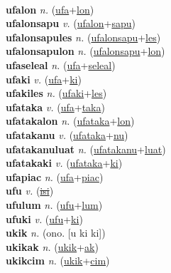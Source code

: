  \label{ufa} \\
\textbf{ufalon} \textit{n.} (\hyperref[ufa]{ufa}+\hyperref[lon]{lon})
 \label{ufalon} \\
\textbf{ufalonsapu} \textit{v.} (\hyperref[ufalon]{ufalon}+\hyperref[sapu]{sapu})
 \label{ufalonsapu} \\
\textbf{ufalonsapules} \textit{n.} (\hyperref[ufalonsapu]{ufalonsapu}+\hyperref[les]{les})
 \label{ufalonsapules} \\
\textbf{ufalonsapulon} \textit{n.} (\hyperref[ufalonsapu]{ufalonsapu}+\hyperref[lon]{lon})
 \label{ufalonsapulon} \\
\textbf{ufaseleal} \textit{n.} (\hyperref[ufa]{ufa}+\hyperref[seleal]{seleal})
 \label{ufaseleal} \\
\textbf{ufaki} \textit{v.} (\hyperref[ufa]{ufa}+\hyperref[ki]{ki})
 \label{ufaki} \\
\textbf{ufakiles} \textit{n.} (\hyperref[ufaki]{ufaki}+\hyperref[les]{les})
 \label{ufakiles} \\
\textbf{ufataka} \textit{v.} (\hyperref[ufa]{ufa}+\hyperref[taka]{taka})
 \label{ufataka} \\
\textbf{ufatakalon} \textit{n.} (\hyperref[ufataka]{ufataka}+\hyperref[lon]{lon})
 \label{ufatakalon} \\
\textbf{ufatakanu} \textit{v.} (\hyperref[ufataka]{ufataka}+\hyperref[nu]{nu})
 \label{ufatakanu} \\
\textbf{ufatakanuluat} \textit{n.} (\hyperref[ufatakanu]{ufatakanu}+\hyperref[luat]{luat})
 \label{ufatakanuluat} \\
\textbf{ufatakaki} \textit{v.} (\hyperref[ufataka]{ufataka}+\hyperref[ki]{ki})
 \label{ufatakaki} \\
\textbf{ufapiac} \textit{n.} (\hyperref[ufa]{ufa}+\hyperref[piac]{piac})
 \label{ufapiac} \\
\textbf{ufu} \textit{v.} (\hyperref[isi]{\sout{isi}})
 \label{ufu} \\
\textbf{ufulum} \textit{n.} (\hyperref[ufu]{ufu}+\hyperref[lum]{lum})
 \label{ufulum} \\
\textbf{ufuki} \textit{v.} (\hyperref[ufu]{ufu}+\hyperref[ki]{ki})
 \label{ufuki} \\
\textbf{ukik} \textit{n.} (ono. [u ki ki])
 \label{ukik} \\
\textbf{ukikak} \textit{n.} (\hyperref[ukik]{ukik}+\hyperref[ak]{ak})
 \label{ukikak} \\
\textbf{ukikcim} \textit{n.} (\hyperref[ukik]{ukik}+\hyperref[cim]{cim})
 \label{ukikcim} \\
